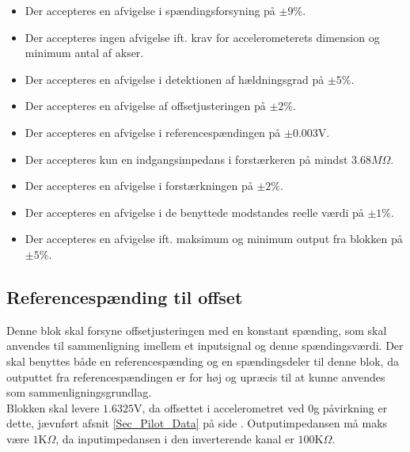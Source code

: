 \begin{itemize}
	\item Der accepteres en afvigelse i spændingsforsyning på $\pm9\%$.
	\item Der accepteres ingen afvigelse ift. krav for accelerometerets dimension og minimum antal af akser.
	\item Der accepteres en afvigelse i detektionen af hældningsgrad på $\pm5\%$.
	\item Der accepteres en afvigelse af offsetjusteringen på $\pm2\%$.
	\item Der accepteres en afvigelse i referencespændingen på $\pm0.003$V.
	\item Der accepteres kun en indgangsimpedans i forstærkeren på mindst $3.68M\Omega$.
	\item Der accepteres en afvigelse i forstærkningen på $\pm2\%$.
	\item Der accepteres en afvigelse i de benyttede modstandes reelle værdi på $\pm1\%$.
	\item Der accepteres en afvigelse ift. maksimum og minimum output fra blokken på $\pm5\%$.
\end{itemize}
\subsection{Referencespænding til offset}\label{Ref_Offset_Afs}
Denne blok skal forsyne offsetjusteringen med en konstant spænding, som skal anvendes til sammenligning imellem et inputsignal og denne spændingsværdi. Der skal benyttes både en referencespænding og en spændingsdeler til denne blok, da outputtet fra referencespændingen er for høj og upræcis til at kunne anvendes som sammenligningsgrundlag. \\
Blokken skal levere $1.6325$V, da offsettet i accelerometret ved $0$g påvirkning er dette, jævnført afsnit \ref{Sec_Pilot_Data} på side \pageref{Sec_Pilot_Data}. Outputimpedansen må maks være $1$K$\Omega$, da inputimpedansen i den inverterende kanal er $100$K$\Omega$.

